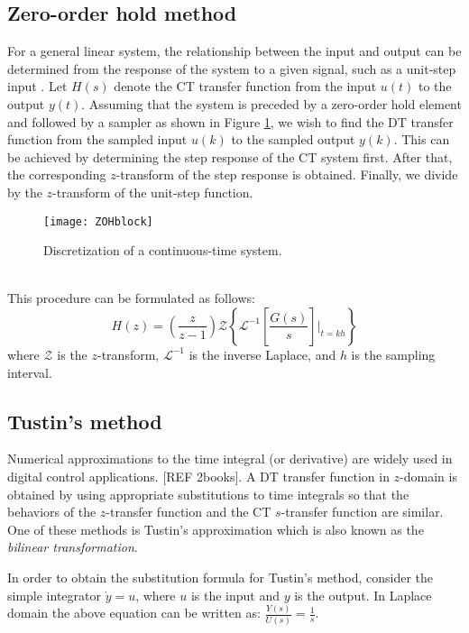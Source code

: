 \documentclass[10pt,journal,final]{IEEEtran}
\begin{document}
\subsection{Zero-order hold method}
For a general linear system, the relationship between the input and output can be determined from the response of the system to a given signal, such as a unit-step input \cite{astrom2011computer}. Let $H(s)$ denote the CT transfer function from the input $u(t)$ to the output $y(t)$. Assuming that the system is preceded by a zero-order hold element and followed by a sampler as shown in Figure \ref{ZOHB}, we wish to find the DT {transfer} function from the sampled input $u(k)$ to the sampled output $y(k)$. This can be achieved by determining the step response of the CT system first. After that, the corresponding $z$-transform of the step response is obtained. Finally, we divide by the $z$-transform of the unit-step function.
\begin{figure}[h!]
\centering
\texttt{[image: ZOHblock]}
\caption{{Discretization of a continuous-time system.}} \label{ZOHB}
\end{figure}\\
This procedure can be formulated as follows:
\begin{equation}\label{eq:pro}
H(z)=\left( \frac{z}{z-1} \right) \mathscr{Z}\left \{ \mathscr{L}^{-1}\left [ \frac{G(s)}{s} \right ] \bigg|_{t=kh} \right \}
\end{equation}
where $\mathscr{Z}$ is the $z$-transform, $\mathscr{L}^{-1}$ is the inverse Laplace, and $h$ is the sampling interval.


\subsection{Tustin's method}
Numerical approximations to the time integral (or derivative) are widely used in digital control applications. [REF 2books]. A DT transfer function in $z$-domain is obtained by using appropriate substitutions to time integrals so that the behaviors of the $z$-transfer function and the CT $s$-transfer function are similar. One of these methods is Tustin's approximation which is also known as the \textit{bilinear transformation}.

In order to {obtain} the {substitution} formula for Tustin's method, consider the simple integrator $ \dot{y}=u$, where $u$ is the input and $y$ is the output. In Laplace domain the above equation can be written as: $\frac{Y(s)}{U(s)}=\frac{1}{s}$.
\end{document}
